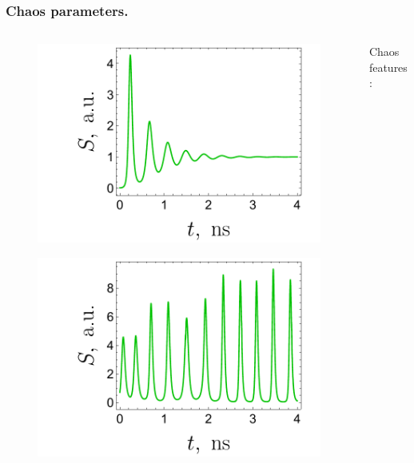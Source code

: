 \begin{frame}
  \frametitle{Chaos parameters.}
  
  \begin{columns}
    \begin{column}{.4\linewidth}
      \begin{figure}
        \centering
        \includegraphics[width=\linewidth]{figures/laser_classic.pdf}
      \end{figure}
      \begin{figure}
        \centering
        \includegraphics[width=\linewidth]{figures/laser_chaos.pdf}
      \end{figure}
    \end{column}
    \begin{column}{.6\linewidth}
      Chaos features:
      \begin{itemize}
      \end{itemize}
      

\end{column}
\end{columns}
\end{frame}
